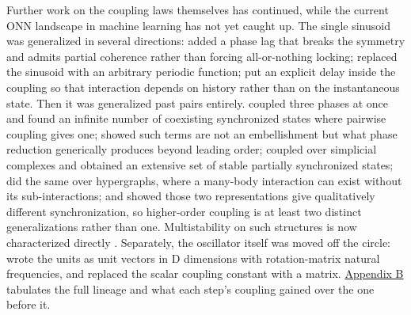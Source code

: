 \documentclass[10pt]{article}
\begin{document}
Further work on the coupling laws themselves has continued, while the
current ONN landscape in machine learning has not yet caught up. The
single sinusoid was generalized in several directions:
\citet{sakaguchi1986} added a phase lag that breaks the symmetry and
admits partial coherence rather than forcing all-or-nothing locking;
\citet{daido1992} replaced the sinusoid with an arbitrary periodic
function; \citet{schuster1989} put an explicit delay inside the coupling
so that interaction depends on history rather than on the instantaneous
state. Then it was generalized past pairs entirely. \citet{tanaka2011}
coupled three phases at once and found an infinite number of coexisting
synchronized states where pairwise coupling gives one;
\citet{ashwin2016} showed such terms are not an embellishment but what
phase reduction generically produces beyond leading order;
\citet{skardal2019} coupled over simplicial complexes and obtained an
extensive set of stable partially synchronized states; \citet{mulas2020}
did the same over hypergraphs, where a many-body interaction can exist
without its sub-interactions; and \citet{zhang2023} showed those two
representations give qualitatively different synchronization, so
higher-order coupling is at least two distinct generalizations rather
than one. Multistability on such structures is now characterized
directly \citep{bacic2026}. Separately, the oscillator itself was moved
off the circle: \citet{chandra2019} wrote the units as unit vectors in D
dimensions with rotation-matrix natural frequencies, and
\citet{de-aguiar2023} replaced the scalar coupling constant with a
matrix. \hyperref[sec-B]{Appendix B} tabulates the full lineage and what
each step's coupling gained over the one before it.
\end{document}

